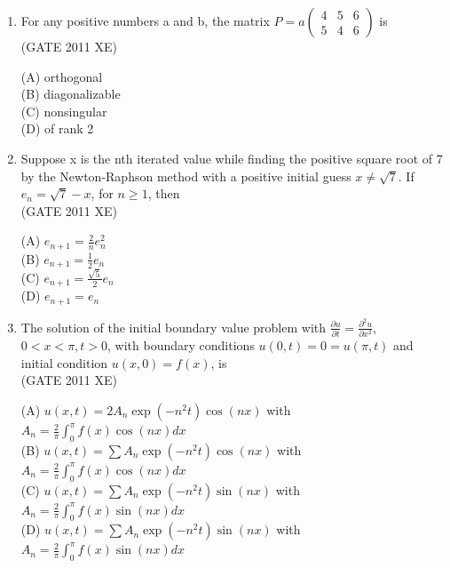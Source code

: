 \documentclass[journal,12pt,onecolumn]{IEEEtran}
\newcommand{\myvec}[1]{\begin{pmatrix}#1\end{pmatrix}}
\begin{document}
\begin{enumerate}
\begin{enumerate}
\begin{enumerate}[label=\textbf{Q\arabic*.},itemsep=2em]
\hfill{(GATE 2011 XE)} \\
\begin{multicols}{4}
(A) $e^{2x} + e^{3x} + 6x + 5$ \\
(B) $e^x + e^{-3x} + 6x + 5$ \\
(C) $e^{2x} + e^{-3x} + 6x + x$ \\
(D) $e^{2x} + e^{3x} + x + 5$
\end{multicols}

\item For any positive numbers a and b, the matrix 
$P = a\myvec{4 & 5 & 6 \\ 5 & 4 & 6}$ is \\

\hfill{(GATE 2011 XE)} \\
\begin{multicols}{4}
(A) orthogonal \\
(B) diagonalizable \\
(C) nonsingular \\
(D) of rank 2
\end{multicols}

\item Suppose x is the nth iterated value while finding the positive square root of 7 by the Newton-Raphson method with a positive initial guess $x \neq \sqrt{7}$. If $e_n = \sqrt{7} - x$, for $n \geq 1$, then \\

\hfill{(GATE 2011 XE)} \\
\begin{multicols}{4}
(A) $e_{n+1} = \frac{2}{n} e_n^2$ \\
(B) $e_{n+1} = \frac{1}{2} e_n$ \\
(C) $e_{n+1} = \frac{\sqrt{5}}{2} e_n$ \\
(D) $e_{n+1} = e_n$
\end{multicols}

\item The solution of the initial boundary value problem with $\frac{\partial u}{\partial t} = \frac{\partial^2 u}{\partial x^2}$, $0 < x < \pi, t > 0$, with boundary conditions $u(0,t)=0 = u(\pi, t)$ and initial condition $u(x,0) = f(x)$, is \\

\hfill{(GATE 2011 XE)} \\
\begin{multicols}{2}
(A) $u(x,t) = 2 A_n \exp(-n^2 t) \cos(nx)$ with $A_n = \frac{2}{\pi} \int_0^{\pi} f(x) \cos(nx) dx$ \\
(B) $u(x,t) = \sum A_n \exp(-n^2 t) \cos(nx)$ with $A_n = \frac{2}{\pi} \int_0^{\pi} f(x) \cos(nx) dx$ \\
(C) $u(x,t) = \sum A_n \exp(-n^2 t) \sin(nx)$ with $A_n = \frac{2}{\pi} \int_0^{\pi} f(x) \sin(nx) dx$ \\
(D) $u(x,t) = \sum A_n \exp(-n^2 t) \sin(nx)$ with $A_n = \frac{2}{\pi} \int_0^{\pi} f(x) \sin(nx) dx$
\end{multicols}


\end{enumerate}
\end{enumerate}
\end{enumerate}
\end{document}
